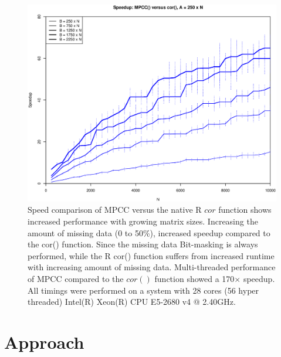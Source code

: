 \documentclass{bioinfo}
\begin{document}



\begin{figure}[H]
\centering
\includegraphics[width=\linewidth]{img/figure02new.eps}
  \caption{
  \small
    Speed comparison of MPCC versus the native R $cor$ function
    shows increased performance with growing matrix sizes. Increasing
    the amount of missing data (0 to 50\%), increased speedup compared 
    to the cor() function. Since the missing data Bit-masking is always 
    performed, while the R cor() function suffers from increased runtime 
    with increasing amount of missing data. Multi-threaded performance 
    of MPCC compared to the $cor()$ function showed a 170$\times$ speedup. 
    All timings were performed on a system with 28 cores (56 hyper threaded) Intel(R)
    Xeon(R) CPU E5-2680 v4 @ 2.40GHz.
}
  \label{fig:fig2}
\end{figure}

\vspace*{-5mm}

\section{Approach}
\end{document}
